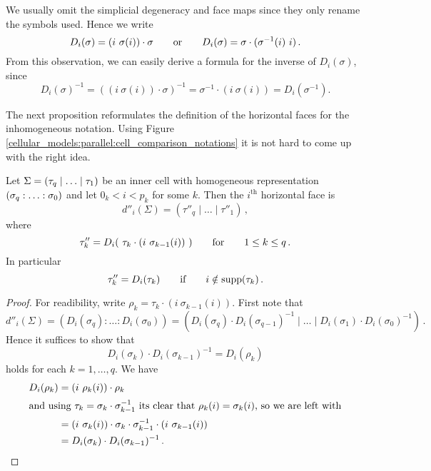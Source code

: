We usually omit the simplicial degeneracy and face maps since they only rename the symbols used.
Hence we write
\[
   D_i(\sigma) = (i\ \sigma(i)) \cdot \sigma \mspc{or}{20} D_i( \sigma) = \sigma \cdot (\sigma^{-1}(i)\ i) \,.
\]
From this observation, we can easily derive a formula for the inverse of $D_i(\sigma)$, since
\[
    D_i(\sigma)^{-1} = ((i\ \sigma(i)) \cdot \sigma)^{-1} = \sigma^{-1} \cdot (i\ \sigma(i)) = D_i(\sigma^{-1}).
\]

The next proposition reformulates the definition of the horizontal faces for the inhomogeneous notation.
Using Figure \ref{cellular_models:parallel:cell_comparison_notations} it is not hard to come up with the right idea.

\begin{prop}
\label{cellular_models:parallel:prop_dh}
Let $\Sigma = \inhomq$ be an inner cell with homogeneous representation $\homogq$ and let $0_k < i < p_k$ for some $k$.
Then the $i^{\text{th}}$ horizontal face is
\[ 
    d''_i(\Sigma) = (\tau''_q \mid \ldots \mid \tau''_1)\,, 
\]
where
\[
    \tau''_k = D_i(\ \tau_k \cdot (i\  \sigma_{k-1}(i))\ )  \mspc{for}{20} 1 \leq k \leq q \,.
\]
In particular
\[
    \tau_k'' = D_i(\tau_k) \mspc{if}{20} i \notin \supp(\tau_k) \,.
\]
\end{prop}

\begin{proof}
For readibility, write $\rho_k = \tau_k \cdot (i\  \sigma_{k-1}(i))$.
First note that
\[ 
    d''_i(\Sigma) = (D_i(\sigma_q): \dotsc: D_i(\sigma_0)) = (D_i(\sigma_q) \cdot D_i(\sigma_{q-1})^{-1} \mid \ldots \mid D_i(\sigma_1) \cdot D_i(\sigma_0)^{-1})\,.
\]
Hence it suffices to show that
\[
    D_i(\sigma_k) \cdot D_i(\sigma_{k-1})^{-1} = D_i (\rho_k)
\]
holds for each $k = 1, \dotsc, q$. 
We have
\begin{align*}
D_i(\rho_k)
    &= (i\  \rho_k(i)) \cdot \rho_k \\
    \intertext{and using $\tau_k = \sigma_k \cdot \sigma_{k-1}^{-1}$ its clear that $\rho_k(i) = \sigma_k(i)$, so we are left with}
    &= (i\  \sigma_k(i)) \cdot \sigma_k \cdot \sigma_{k-1}^{-1} \cdot (i\  \sigma_{k-1}(i))\\
    &= D_i(\sigma_k) \cdot D_i(\sigma_{k-1})^{-1}\,.
\end{align*}
\end{proof}
